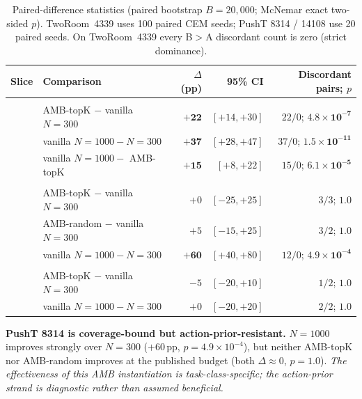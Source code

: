 \documentclass{article}
\begin{document}
\begin{table}[ht]
\centering\footnotesize
\caption{Paired-difference statistics (paired bootstrap $B{=}20{,}000$; McNemar exact two-sided $p$). TwoRoom~4339 uses 100 paired CEM seeds; PushT 8314 / 14108 use 20 paired seeds. On TwoRoom~4339 every B$>$A discordant count is zero (strict dominance).}
\label{tab:paired-stats}
\renewcommand{\arraystretch}{1.05}
\begin{tabularx}{\textwidth}{@{}>{\raggedright\arraybackslash}p{2.4cm}>{\raggedright\arraybackslash}X r r r@{}}
\toprule
Slice & Comparison & $\Delta$ (pp) & 95\% CI & Discordant pairs; $p$ \\
\midrule
\multicolumn{5}{@{}l}{\textit{TwoRoom 4339 ($n{=}100$)}} \\
& AMB-topK $-$ vanilla $N{=}300$        & $\mathbf{+22}$ & $[+14, +30]$ & $22/0$; $\mathbf{4.8\times10^{-7}}$ \\
& vanilla $N{=}1000 - N{=}300$          & $\mathbf{+37}$ & $[+28, +47]$ & $37/0$; $\mathbf{1.5\times10^{-11}}$ \\
& vanilla $N{=}1000 -$ AMB-topK         & $\mathbf{+15}$ & $[+8, +22]$  & $15/0$; $\mathbf{6.1\times10^{-5}}$ \\
\midrule
\multicolumn{5}{@{}l}{\textit{PushT 8314 ($n{=}20$)}} \\
& AMB-topK $-$ vanilla $N{=}300$        & $+0$           & $[-25, +25]$ & $3/3$; $1.0$ \\
& AMB-random $-$ vanilla $N{=}300$      & $+5$           & $[-15, +25]$ & $3/2$; $1.0$ \\
& vanilla $N{=}1000 - N{=}300$          & $\mathbf{+60}$ & $[+40, +80]$ & $12/0$; $\mathbf{4.9\times10^{-4}}$ \\
\midrule
\multicolumn{5}{@{}l}{\textit{PushT 14108 ($n{=}20$)}} \\
& AMB-topK $-$ vanilla $N{=}300$        & $-5$           & $[-20, +10]$ & $1/2$; $1.0$ \\
& vanilla $N{=}1000 - N{=}300$          & $+0$           & $[-20, +20]$ & $2/2$; $1.0$ \\
\bottomrule
\end{tabularx}
\end{table}

\textbf{PushT 8314 is coverage-bound but action-prior-resistant.} $N{=}1000$ improves strongly over $N{=}300$ ($+60$\,pp, $p = 4.9\times10^{-4}$), but neither AMB-topK nor AMB-random improves at the published budget (both $\Delta \approx 0$, $p = 1.0$). \emph{The effectiveness of this AMB instantiation is task-class-specific; the action-prior strand is diagnostic rather than assumed beneficial.}
\end{document}
